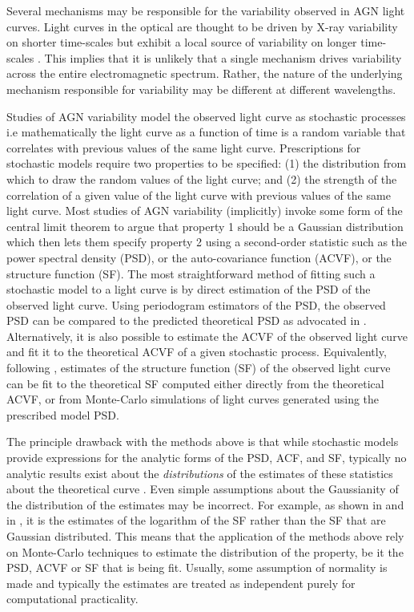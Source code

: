 \documentclass[a4paper,fleqn,usenatbib]{mnras}
\begin{document}
Several mechanisms may be responsible for the variability observed in AGN light curves. Light curves in the optical are thought to be driven by X-ray variability on shorter time-scales but exhibit a local source of variability on longer time-scales \citep{UttleyAccretion}. This implies that it is unlikely that a single mechanism drives variability across the entire electromagnetic spectrum. Rather, the nature of the underlying mechanism responsible for variability may be different at different wavelengths.

Studies of AGN variability model the observed light curve as stochastic processes i.e mathematically the light curve as a function of time is a random variable that correlates with previous values of the same light curve. Prescriptions for stochastic models require two properties to be specified: (1) the distribution from which to draw the random values of the light curve; and (2) the strength of the correlation of a given value of the light curve with previous values of the same light curve. Most studies of AGN variability (implicitly) invoke some form of the central limit theorem to argue that property 1 should be a Gaussian distribution which then lets them specify property 2 using a second-order statistic such as the power spectral density (PSD), or the auto-covariance function (ACVF), or the structure function (SF). The most straightforward method of fitting such a stochastic model to a light curve is by direct estimation of the PSD of the observed light curve. Using periodogram estimators of the PSD, the observed PSD can be compared to the predicted theoretical PSD as advocated in \citet*{Uttley02}. Alternatively, it is also possible to estimate the ACVF of the observed light curve and fit it to the theoretical ACVF of a given stochastic process. Equivalently, following \citet*{Kasliwal15}, estimates of the structure function (SF) of the observed light curve can be fit to the theoretical SF computed either directly from the theoretical ACVF, or from Monte-Carlo simulations of light curves generated using the prescribed model PSD.

The principle drawback with the methods above is that while stochastic models provide expressions for the analytic forms of the PSD, ACF, and SF, typically no analytic results exist about the \textit{distributions} of the estimates of these statistics about the theoretical curve \citep{BrockwellDavisITSF}. Even simple assumptions about the Gaussianity of the distribution of the estimates may be incorrect. For example, as shown in \citet*{Emm10} and in \citet{Kasliwal15}, it is the estimates of the logarithm of the SF rather than the SF that are Gaussian distributed. This means that the application of the methods above rely on Monte-Carlo techniques to estimate the distribution of the property, be it the PSD, ACVF or SF that is being fit. Usually, some assumption of normality is made and typically the estimates are treated as independent purely for computational practicality.
\end{document}
